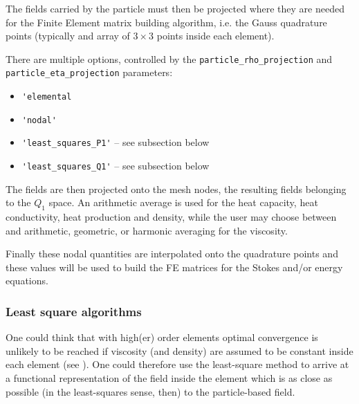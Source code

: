 \documentclass[a4paper,12pt]{article}
\begin{document}
The fields carried by the particle must then be projected where 
they are needed for the Finite Element matrix building algorithm, i.e. 
the Gauss quadrature points (typically and array of $3\times 3$ points inside
each element).

There are multiple options, controlled by the 
\lstinline{particle_rho_projection} and \lstinline{particle_eta_projection}
parameters:
\begin{itemize}
\item \lstinline{'elemental}
\item \lstinline{'nodal'}
\item \lstinline{'least_squares_P1'} -- see subsection below 
\item \lstinline{'least_squares_Q1'} -- see subsection below 
\end{itemize}


The fields are then projected onto the mesh nodes, the resulting fields belonging 
to the $Q_1$ space. An arithmetic average is used for the 
heat capacity, heat conductivity, heat production and density, while the user may choose 
between and arithmetic, geometric, or harmonic averaging for the viscosity.



Finally these nodal quantities are interpolated onto the quadrature points and these 
values will be used to build the FE matrices for the Stokes and/or energy equations.

\subsubsection{Least square algorithms}

One could think that 
with high(er) order elements optimal convergence is unlikely to be reached 
if viscosity (and density) are assumed to be constant inside each element (see  
\textcite{galb19}). 
One could therefore use the least-square method to arrive at 
a functional representation of the field inside the element which is as 
close as possible (in the least-squares sense, then) to the particle-based field. 
\end{document}
